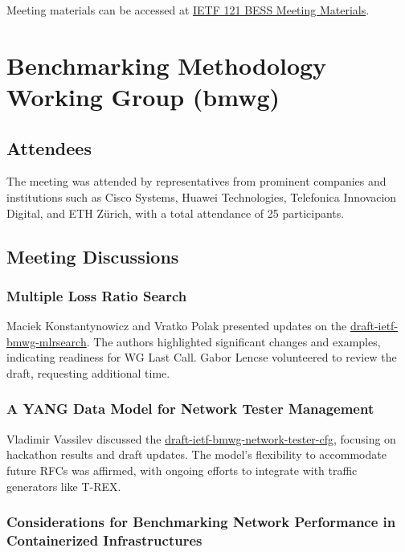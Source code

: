 \documentclass{article}
\begin{document}
Meeting materials can be accessed at \href{https://www.ietf.org/proceedings/121/bess.html}{IETF 121 BESS Meeting Materials}.



\newpage

\section{Benchmarking Methodology Working Group (bmwg)}

\subsection{Attendees}

The meeting was attended by representatives from prominent companies and institutions such as Cisco Systems, Huawei Technologies, Telefonica Innovacion Digital, and ETH Zürich, with a total attendance of 25 participants.

\subsection{Meeting Discussions}

\subsubsection{Multiple Loss Ratio Search}

Maciek Konstantynowicz and Vratko Polak presented updates on the \href{https://datatracker.ietf.org/doc/html/draft-ietf-bmwg-mlrsearch}{draft-ietf-bmwg-mlrsearch}. The authors highlighted significant changes and examples, indicating readiness for WG Last Call. Gabor Lencse volunteered to review the draft, requesting additional time.

\subsubsection{A YANG Data Model for Network Tester Management}

Vladimir Vassilev discussed the \href{https://datatracker.ietf.org/doc/html/draft-ietf-bmwg-network-tester-cfg}{draft-ietf-bmwg-network-tester-cfg}, focusing on hackathon results and draft updates. The model's flexibility to accommodate future RFCs was affirmed, with ongoing efforts to integrate with traffic generators like T-REX.

\subsubsection{Considerations for Benchmarking Network Performance in Containerized Infrastructures}
\end{document}
